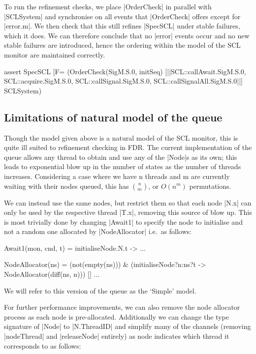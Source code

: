 To run the refinement checks, we place |OrderCheck| in parallel with |SCLSystem| and synchronise on all events that |OrderCheck| offers except for |error.m|. We then check that this still refines |SpecSCL| under stable failures, which it does. We can therefore conclude that no |error| events occur and no new stable failures are introduced, hence the ordering within the model of the SCL monitor are maintained correctly.

\begin{cspm}
assert SpecSCL [F= (OrderCheck(SigM.S.0, initSeq) 
                     [|{|SCL::callAwait.SigM.S.0,
                         SCL::acquire.SigM.S.0,
                         SCL::callSignal.SigM.S.0,
                         SCL::callSignalAll.SigM.S.0|}|] SCLSystem)
\end{cspm}

\subsection{Limitations of natural model of the queue}

Though the model given above is a natural model of the SCL monitor, this is quite ill suited to refinement checking in FDR. The current implementation of the queue allows any thread to obtain and use any of the |Node|s as its own; this leads to exponential blow up in the number of states as the number of threads increases. Considering a case where we have n threads and m are currently waiting with their nodes queued, this has $n\choose{m}$, or $O(n^{m})$ permutations.

We can instead use the same nodes, but restrict them so that each node |N.x| can only be used by the respective thread |T.x|, removing this source of blow up. This is most trivially done by changing |Await1| to specify the node to initialise and not a random one allocated by |NodeAllocator| i.e.~as follows:

\begin{cspm}
  Await1(mon, cnd, t) = initialiseNode.N.t -> ...

  NodeAllocator(ns) = 
      (not(empty(ns))) & (initialiseNode?n:ns?t -> NodeAllocator(diff(ns, {n}))) 
   [] ...
\end{cspm}

We will refer to this version of the queue as the `Simple' model.

For further performance improvements, we can also remove the node allocator process as each node is pre-allocated. Additionally we can change the type signature of |Node| to |N.ThreadID| and simplify many of the channels (removing |nodeThread| and |releaseNode| entirely) as node indicates which thread it corresponds to as follows:

